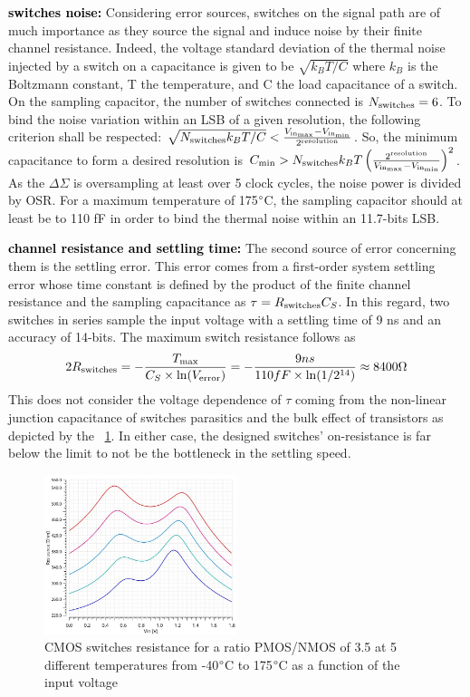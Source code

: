 \textbf{\textcolor{black}{switches noise:}}
Considering error sources, switches on the signal path are of much importance as they source the signal and induce noise by their finite channel resistance.
Indeed, the voltage standard deviation of the thermal noise injected by a switch on a capacitance is given to be \(\sqrt{k_BT/C} \) where \(k_B\) is the Boltzmann constant, T the temperature, and C the load capacitance of a switch. On the sampling capacitor, the number of switches connected is $N_{\rm switches} = 6$. To bind the noise variation within an LSB of a given resolution, the following criterion shall be respected: $\sqrt{N_{\rm switches} k_BT/C} < \frac{V_{\rm in_{\max}}-V_{\rm in_{\min}}}{2^{\rm resolution}}$. So, the minimum capacitance to form a desired resolution is $C_{\min} > N_{\rm switches} k_BT \left(\frac{2^{\rm resolution}}{V_{\rm in_{\max}}-V_{\rm in_{\min}}} \right)^2$. As the $\Delta\Sigma$ is oversampling at least over 5 clock cycles, the noise power is divided by OSR\@. For a maximum temperature of 175\(\degree \)C, the sampling capacitor should at least be to 110 fF in order to bind the thermal noise within an 11.7-bits LSB\@.

\textbf{\textcolor{black}{channel resistance and settling time:}}
The second source of error concerning them is the settling error. This error comes from a first-order system settling error whose time constant is defined by the product of the finite channel resistance and the sampling capacitance as \(\tau = R_{\rm switches}C_S \). In this regard, two switches in series sample the input voltage with a settling time of 9 ns and an accuracy of 14-bits. The maximum switch resistance follows as
\begin{equation}
2 R_{\rm switches} = -\frac{T_{\max}}{C_S \times \ln(V_{\rm error})} = - \frac{9 ns}{110 fF \times \ln (1/2^{14})} \approx 8400 \Omega
\end{equation}
This does not consider the voltage dependence of \(\tau \) coming from the non-linear junction capacitance of switches parasitics and the bulk effect of transistors as depicted by the \figurename~\ref{fig:cmos-ron-vin-temp}. In either case, the designed switches' on-resistance is far below the limit to not be the bottleneck in the settling speed.
\begin{figure}[htp]
	\centering
	\includegraphics[width=0.5\textwidth]{Chapter4/Figs/xt018_2u_180nm_3-5_resistance.jpg}
	\caption{CMOS switches resistance for a ratio PMOS/NMOS of 3.5 at 5 different temperatures from -40$\degree$C to 175$\degree$C as a function of the input voltage}
	\label{fig:cmos-ron-vin-temp}
\end{figure}


